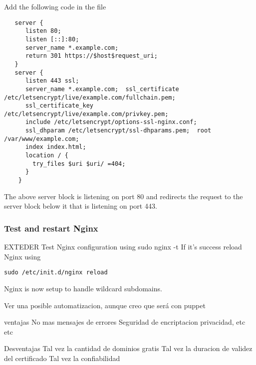 Add the following code in the file

\begin{verbatim}
   server {
      listen 80;
      listen [::]:80;
      server_name *.example.com;
      return 301 https://$host$request_uri;
   }
   server {
      listen 443 ssl;
      server_name *.example.com;  ssl_certificate /etc/letsencrypt/live/example.com/fullchain.pem;
      ssl_certificate_key /etc/letsencrypt/live/example.com/privkey.pem;
      include /etc/letsencrypt/options-ssl-nginx.conf;
      ssl_dhparam /etc/letsencrypt/ssl-dhparams.pem;  root /var/www/example.com;
      index index.html;
      location / {
        try_files $uri $uri/ =404;
      }
    } 
\end{verbatim}

The above server block is listening on port 80 and redirects the request to the server block below 
it that is listening on port 443.

\subsubsection*{Test and restart Nginx}
EXTEDER
Test Nginx configuration using 
sudo nginx -t
If it’s success reload Nginx using 
\begin{verbatim}
sudo /etc/init.d/nginx reload
\end{verbatim}
Nginx is now setup to handle wildcard subdomains.

Ver una posible automatizacion, aunque creo que será con puppet

ventajas
No mas mensajes de errores
Seguridad de encriptacion 
privacidad, etc etc

Desventajas
Tal vez la cantidad de dominios gratis
Tal vez la duracion de validez del certificado
Tal vez la confiabilidad



